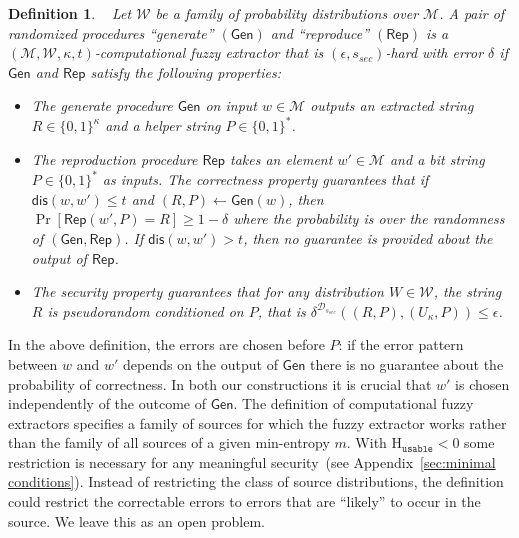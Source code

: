 \documentclass[11pt]{article}
\newcommand{\apref}[1]{\mbox{Appendix~\ref{#1}}}
\newcommand{\class}[1]{{\ensuremath{\mathsf{#1}}}}
\newcommand{\gen}{\ensuremath{\class{Gen}}\xspace}
\newcommand{\rep}{\ensuremath{\class{Rep}}\xspace}
\newcommand{\dis}{\ensuremath{\mathsf{dis}}}
\newcommand{\Huse}{\mathrm{H}_{\mathtt{usable}}}
\newtheorem{definition}[theorem]{Definition}
\begin{document}
\begin{definition}~\cite[Definition 2.5]{fuller2013computational}
\label{def:comp fuzzy extractor}
Let $\mathcal{W}$ be a family of probability distributions over $\mathcal{M}$. A pair of randomized procedures ``generate'' $(\gen)$ and ``reproduce'' $(\rep)$ is a $(\mathcal{M}, \mathcal{W}, \kappa, t)$-\emph{computational fuzzy extractor} that is $(\epsilon, s_{sec})$-hard with error $\delta$ if \gen and \rep satisfy the following properties:
\begin{itemize}
\item The generate procedure \gen on input $w\in \mathcal{M}$ outputs an extracted string $R\in\{0,1\}^\kappa$ and a helper string $P\in\{0,1\}^*$.
\item The reproduction procedure \rep takes an element $w'\in\mathcal{M}$ and a bit string $P\in\{0,1\}^*$ as inputs.  The \emph{correctness} property guarantees that if $\dis(w, w')\leq t$ and $(R, P)\leftarrow \gen(w)$, then $\Pr[\rep( w', P) = R] \geq 1-\delta$ where the probability is over the randomness of $(\gen, \rep)$.
If $\dis(w, w') > t$, then no guarantee is provided about the output of \rep.
\item The \emph{security} property guarantees that for any distribution $W\in \mathcal{W}$, the string $R$ is pseudorandom conditioned on $P$, that is $\delta^{\mathcal{D}_{s_{sec}}}((R, P), (U_\kappa, P))\leq \epsilon$.
\end{itemize}
\end{definition}
In the above definition, the errors are chosen before $P$: if the error pattern between $w$ and $w'$ depends on the output of $\gen$ there is no guarantee about the probability of correctness. In both our constructions it is crucial that $w'$ is chosen independently of the outcome of \gen.
The definition of computational fuzzy extractors specifies a family of sources for which the fuzzy extractor works rather than the family of all sources of a given min-entropy $m$.  With $\Huse<0$ some restriction is necessary for any meaningful security~(see \apref{sec:minimal conditions}).  Instead of restricting the class of source distributions, the definition could restrict the correctable errors to errors that are ``likely'' to occur in the source.  We leave this as an open problem.
\end{document}
